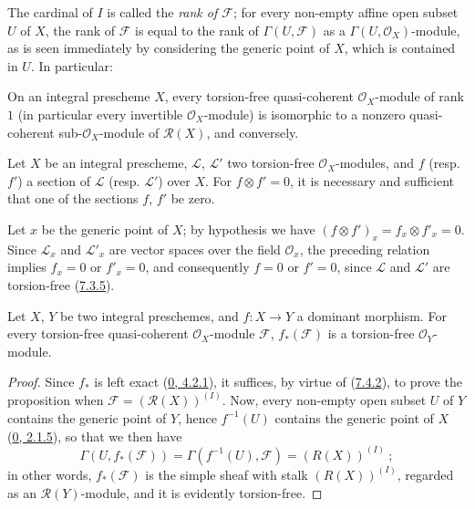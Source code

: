 The cardinal of $I$ is called the \emph{rank of $\mathscr{F}$}; for every
non-empty affine open subset $U$ of $X$, the rank of $\mathscr{F}$ is equal
to the rank of $\Gamma(U,\mathscr{F})$ as a $\Gamma(U,\mathscr{O}_X)$-module,
as is seen immediately by considering the generic point of $X$, which is
contained in $U$. In particular:

\begin{corollary}[7.4.3]
\label{I.7.4.3}
On an integral prescheme $X$, every torsion-free quasi-coherent
$\mathscr{O}_X$-module of rank $1$ (in particular every invertible
$\mathscr{O}_X$-module) is isomorphic to a nonzero quasi-coherent
sub-$\mathscr{O}_X$-module of $\mathscr{R}(X)$, and conversely.
\end{corollary}

\begin{corollary}[7.4.4]
\label{I.7.4.4}
Let $X$ be an integral prescheme, $\mathscr{L}$, $\mathscr{L}'$ two
torsion-free $\mathscr{O}_X$-modules, and $f$ (resp. $f'$) a section of
$\mathscr{L}$ (resp. $\mathscr{L}'$) over $X$. For
$f\otimes f'=0$, it is necessary and sufficient that one of the sections $f$,
$f'$ be zero.
\end{corollary}

Let $x$ be the generic point of $X$; by hypothesis we have
$(f\otimes f')_x=f_x\otimes f'_x=0$. Since $\mathscr{L}_x$ and
$\mathscr{L}'_x$ are vector spaces over the field
$\mathscr{O}_x$, the preceding relation implies $f_x=0$ or $f'_x=0$, and
consequently $f=0$ or $f'=0$, since $\mathscr{L}$ and $\mathscr{L}'$ are
torsion-free (\hyperref[I.7.3.5]{7.3.5}).

\begin{proposition}[7.4.5]
\label{I.7.4.5}
Let $X$, $Y$ be two integral preschemes, and $f:X\to Y$ a dominant morphism.
For every torsion-free quasi-coherent $\mathscr{O}_X$-module $\mathscr{F}$,
$f_*(\mathscr{F})$ is a torsion-free $\mathscr{O}_Y$-module.
\end{proposition}

\begin{proof}
Since $f_*$ is left exact
(\hyperref[0.4.2.1]{0, 4.2.1}), it suffices, by virtue of
(\hyperref[I.7.4.2]{7.4.2}), to prove the proposition when
$\mathscr{F}=(\mathscr{R}(X))^{(I)}$. Now, every non-empty open subset $U$ of
$Y$ contains the generic point of $Y$, hence $f^{-1}(U)$ contains the generic
point of $X$ (\hyperref[0.2.1.5]{0, 2.1.5}), so that we then have
\[
  \Gamma(U,f_*(\mathscr{F}))
  =\Gamma(f^{-1}(U),\mathscr{F})=(R(X))^{(I)}~;
\]
in other words, $f_*(\mathscr{F})$ is the simple sheaf with stalk
$(R(X))^{(I)}$, regarded as an $\mathscr{R}(Y)$-module, and it is evidently
torsion-free.
\end{proof}

